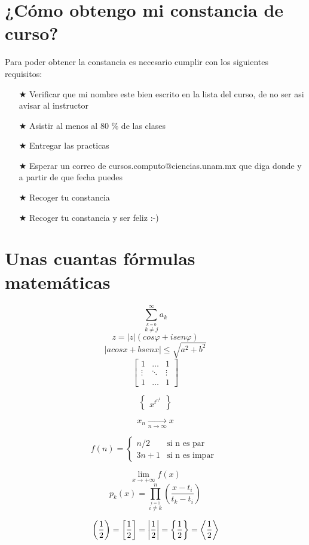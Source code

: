 \documentclass[letterpaper,12pt]{article}
\begin{document}
\section{¿Cómo obtengo mi constancia de curso?}
Para poder obtener la constancia es necesario cumplir con los siguientes requisitos:
\begin{enumerate}
	 \item[$\bigstar$] Verificar que mi nombre este bien escrito en la lista del curso, de no ser asi avisar al instructor
	 \item[$\bigstar$] Asistir al menos al 80 \% de las clases
	 \item[$\bigstar$] Entregar las practicas
	 \item[$\bigstar$] Esperar un correo de cursos.computo@ciencias.unam.mx que diga donde y a partir de que fecha puedes
	 \item[$\bigstar$] Recoger tu constancia	
	 \item[$\bigstar$] Recoger tu constancia y ser feliz :-)
\end{enumerate}


\section{Unas cuantas fórmulas matemáticas}

$$\sum_{\overset{k=0}{k\neq j}}^{\infty} a_k$$
$$z=|z|(cos \varphi + i sen \varphi) $$
$$|a cos x + b sen x| \leq \sqrt{{a}^2 + {b}^2} $$
\[\left[ \begin{array}{ccc}
	1 & \hdots & 1 \\
	\vdots & \ddots & \vdots \\
	1 & \hdots & 1 
\end{array}
\right]
\]

\[\left\{\begin{array}{c}
	x^{t^{n^{2}}}
\end{array}
\right\}
\]

$${x_n \underset{{n \to \infty}}{\longrightarrow} x}$$

\[
f(n)= \left\{ 
\begin{array}{ccc}
	n/2 & \mbox{si n es par } \\	
	3n+1 & \mbox{si n es impar } 
\end{array}
\right.
\]

\[ \lim_{x \to +\infty} f(x) \]
$$p_k(x)= \prod_{\overset{i=1}{i\neq k}}^{n} \left( \frac{x-t_i}{t_k-t_i} \right)$$

\begin{equation}
\left( \frac{1}{2} \right)= \displaystyle \left[ {1 \over 2}\right] = 
\displaystyle \left | \frac{1}{2} \right | = \left\{ \frac{1}{2} \right\} =
\left \langle \frac{1}{2} \right \rangle
\end{equation}
\end{document}
